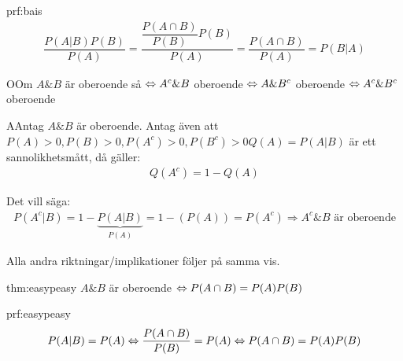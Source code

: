 \newpage
\begin{prf}{prf:bais}
  \begin{equation*}
    \begin{gathered}
      \dfrac{P(A|B)P(B)}{P(A)} = \dfrac{\dfrac{P(A\cap B)}{P(B)}P(B)}{P(A)} = \dfrac{P(A\cap B)}{P(A)} = P(B|A)
    \end{gathered}
  \end{equation*}
\end{prf}
\par\bigskip
\begin{theo}
  OOm $A\&B$ är oberoende så $\Leftrightarrow A^c\&B$ oberoende $\Leftrightarrow A\&B^c$ oberoende $\Leftrightarrow A^c\&B^c$ oberoende
\end{theo}
\par\bigskip
\begin{prf}
  AAntag $A\&B$ är oberoende. Antag även att $P(A)>0, P(B)>0, P(A^c)>0, P(B^c)>0$$Q(A) = P(A|B)$ är ett sannolikhetsmått, då gäller:
  \begin{equation*}
    \begin{gathered}
      Q(A^c) = 1-Q(A)
    \end{gathered}
  \end{equation*}\par
  \noindent Det vill säga:
  \begin{equation*}
    \begin{gathered}
      P(A^c|B) = 1-\underbrace{P(A|B)}_{\text{$P(A)$}} = 1-(P(A)) = P(A^c)\Rightarrow A^c\&B\text{ är oberoende}
    \end{gathered}
  \end{equation*}\par
  \noindent Alla andra riktningar/implikationer följer på samma vis.
\end{prf}
\par\bigskip
\begin{theo}{thm:easypeasy}
  $A\&B$ är oberoende $\Leftrightarrow P(A\cap B) = P(A)P(B)$
\end{theo}
\par\bigskip
\begin{prf}{prf:easypeasy}
  \begin{equation*}
    \begin{gathered}
      P(A|B) = P(A)\Leftrightarrow \dfrac{P(A\cap B)}{P(B)} = P(A)\Leftrightarrow P(A\cap B) = P(A)P(B)
    \end{gathered}
  \end{equation*}
\end{prf}
\par\bigskip
